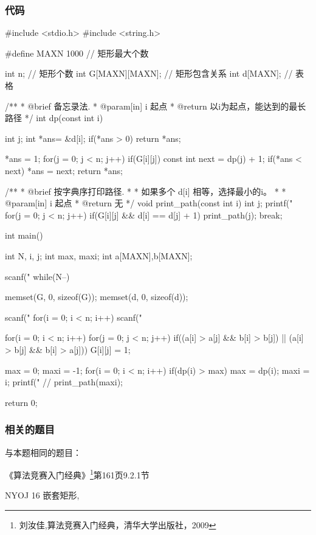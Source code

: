 \subsubsection{代码}
\begin{Codex}[label=embedded_rectangles.c]
#include <stdio.h>
#include <string.h>

#define MAXN 1000 // 矩形最大个数

int n; // 矩形个数
int G[MAXN][MAXN]; // 矩形包含关系
int d[MAXN]; // 表格

/**
 * @brief 备忘录法.
 * @param[in] i 起点
 * @return 以i为起点，能达到的最长路径
 */
int dp(const int i) {
    int j;
    int *ans= &d[i];
    if(*ans > 0) return *ans;

    *ans = 1;
    for(j = 0; j < n; j++) if(G[i][j]) {
        const int next = dp(j) + 1;
        if(*ans < next) *ans = next;
    }
    return *ans;
}

/**
 * @brief 按字典序打印路径.
 *
 * 如果多个 d[i] 相等，选择最小的i。
 *
 * @param[in] i 起点
 * @return 无
 */
void print_path(const int i) {
    int j;
    printf("%
    for(j = 0; j < n; j++) if(G[i][j] && d[i] == d[j] + 1) {
        print_path(j);
        break;
    }
}

int main() {
    int N, i, j;
    int max, maxi;
    int a[MAXN],b[MAXN];

    scanf("%
    while(N--) {
        memset(G, 0, sizeof(G));
        memset(d, 0, sizeof(d));

        scanf("%
        for(i = 0; i < n; i++) scanf("%

        for(i = 0; i < n; i++)
            for(j = 0; j < n; j++)
                if((a[i] > a[j] && b[i] > b[j]) ||
                    (a[i] > b[j] && b[i] > a[j])) G[i][j] = 1;

        max = 0;
        maxi = -1;
        for(i = 0; i < n; i++) if(dp(i) > max) {
            max = dp(i);
            maxi = i;
        }
        printf("%
        // print_path(maxi);
    }
    return 0;
}
\end{Codex}

\subsubsection{相关的题目}
与本题相同的题目：
\begindot
\item 《算法竞赛入门经典》\footnote{刘汝佳,算法竞赛入门经典，清华大学出版社，2009}第161页9.2.1节
\item  NYOJ 16 嵌套矩形, 
\myenddot


